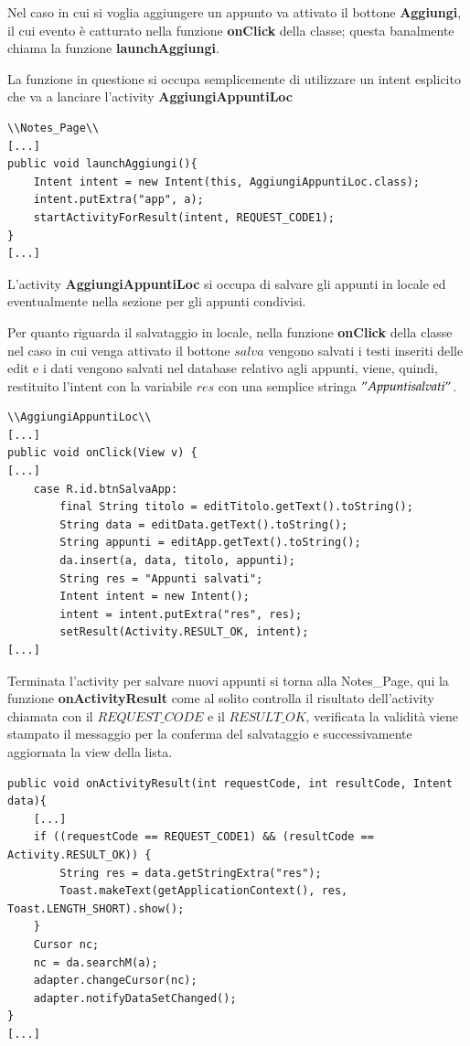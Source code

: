 \documentclass[a4paper, 50pt, twoside]{article}
\begin{document}
Nel caso in cui si voglia aggiungere un appunto va attivato il bottone \textbf{Aggiungi}, il cui evento è catturato nella funzione \textbf{onClick} della classe; questa banalmente chiama la funzione \textbf{launchAggiungi}.

La funzione in questione si occupa semplicemente di utilizzare un intent esplicito che va a lanciare l'activity \textbf{AggiungiAppuntiLoc}

\begin{lstlisting}
\\Notes_Page\\
[...]
public void launchAggiungi(){
	Intent intent = new Intent(this, AggiungiAppuntiLoc.class);
	intent.putExtra("app", a);
	startActivityForResult(intent, REQUEST_CODE1);
}
[...]
\end{lstlisting}

L'activity \textbf{AggiungiAppuntiLoc} si occupa di salvare gli appunti in locale ed eventualmente nella sezione per gli appunti condivisi.

Per quanto riguarda il salvataggio in locale, nella funzione \textbf{onClick} della classe nel caso in cui venga attivato il bottone $salva$ vengono salvati i testi inseriti delle edit e i dati vengono salvati nel database relativo agli appunti, viene, quindi, restituito l'intent con la variabile $res$ con una semplice stringa $"Appunti salvati"$.

\begin{lstlisting}
\\AggiungiAppuntiLoc\\
[...]
public void onClick(View v) {
[...]
	case R.id.btnSalvaApp:
		final String titolo = editTitolo.getText().toString();
		String data = editData.getText().toString();
		String appunti = editApp.getText().toString();
		da.insert(a, data, titolo, appunti);
		String res = "Appunti salvati";
		Intent intent = new Intent();
		intent = intent.putExtra("res", res);
		setResult(Activity.RESULT_OK, intent);
[...]
\end{lstlisting}

Terminata l'activity per salvare nuovi appunti si torna alla Notes\_Page, qui la funzione \textbf{onActivityResult} come al solito controlla il risultato dell'activity chiamata con il $REQUEST\_CODE$ e il $RESULT\_OK$, verificata la validità viene stampato il messaggio per la conferma del salvataggio e successivamente aggiornata la view della lista.

\begin{lstlisting}
public void onActivityResult(int requestCode, int resultCode, Intent data){
	[...]
	if ((requestCode == REQUEST_CODE1) && (resultCode == Activity.RESULT_OK)) {
		String res = data.getStringExtra("res");
		Toast.makeText(getApplicationContext(), res, Toast.LENGTH_SHORT).show();
	}
	Cursor nc;
	nc = da.searchM(a);
	adapter.changeCursor(nc);
	adapter.notifyDataSetChanged();
}
[...]
\end{lstlisting}
\newpage
\end{document}
